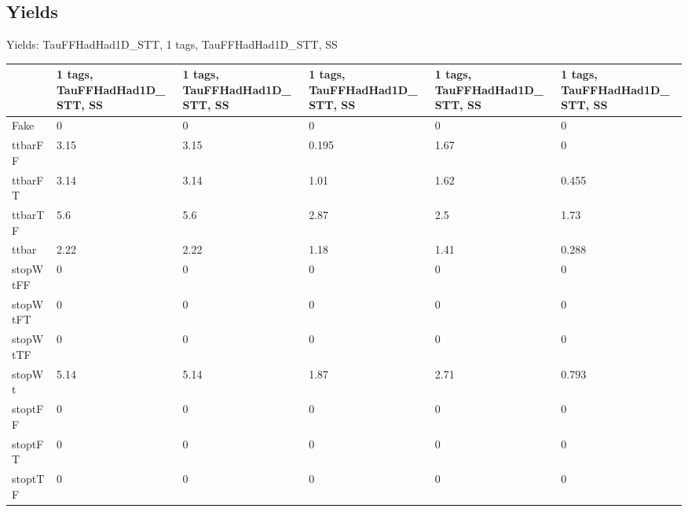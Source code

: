 
\subsection{Yields}

\begin{frame}{Yields: TauFFHadHad1D\_STT, 1 tags, TauFFHadHad1D\_STT, SS}
\begin{center}
  \begin{tabular}{l| >{\centering\let\newline\\\arraybackslash\hspace{0pt}}m{1.4cm}| >{\centering\let\newline\\\arraybackslash\hspace{0pt}}m{1.4cm}| >{\centering\let\newline\\\arraybackslash\hspace{0pt}}m{1.4cm}| >{\centering\let\newline\\\arraybackslash\hspace{0pt}}m{1.4cm}| >{\centering\let\newline\\\arraybackslash\hspace{0pt}}m{1.4cm}}
    & 1 tags, TauFFHadHad1D\_STT, SS & 1 tags, TauFFHadHad1D\_STT, SS & 1 tags, TauFFHadHad1D\_STT, SS & 1 tags, TauFFHadHad1D\_STT, SS & 1 tags, TauFFHadHad1D\_STT, SS \\
 \hline \hline
    Fake& 0 & 0 & 0 & 0 & 0 \\
 \hline
    ttbarFF& 3.15 & 3.15 & 0.195 & 1.67 & 0 \\
 \hline
    ttbarFT& 3.14 & 3.14 & 1.01 & 1.62 & 0.455 \\
 \hline
    ttbarTF& 5.6 & 5.6 & 2.87 & 2.5 & 1.73 \\
 \hline
    ttbar& 2.22 & 2.22 & 1.18 & 1.41 & 0.288 \\
 \hline
    stopWtFF& 0 & 0 & 0 & 0 & 0 \\
 \hline
    stopWtFT& 0 & 0 & 0 & 0 & 0 \\
 \hline
    stopWtTF& 0 & 0 & 0 & 0 & 0 \\
 \hline
    stopWt& 5.14 & 5.14 & 1.87 & 2.71 & 0.793 \\
 \hline
    stoptFF& 0 & 0 & 0 & 0 & 0 \\
 \hline
    stoptFT& 0 & 0 & 0 & 0 & 0 \\
 \hline
    stoptTF& 0 & 0 & 0 & 0 & 0 \\

\end{tabular}
\end{center}
\end{frame}
